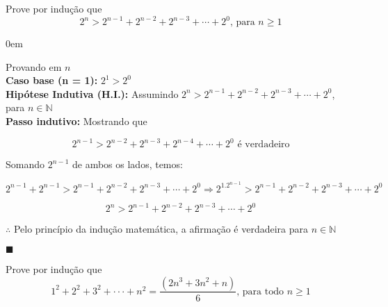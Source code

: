 \documentclass[12pt]{article}
\newcommand{\N}{\mathbb{N}}
\renewcommand{\qed}{\hfill$\blacksquare$}
\renewenvironment{proof}{\begin{addmargin}[1em]{0em}\begin{newproof}}{\end{newproof}\end{addmargin}\qed}
\newenvironment{problem}[2][Problema]{\begin{trivlist}
\item[\hskip \labelsep {\bfseries #1}\hskip \labelsep {\bfseries #2.}]}{\end{trivlist}}
\begin{document}
 

 
 
\begin{problem}{1}
Prove por indução que $$2^n > 2^{n-1} + 2^{n-2} + 2^{n-3} + \cdots + 2^0 \text{, para } n \ge 1$$
\end{problem}

\begin{proof}
    Provando em $n$ \\
    \textbf{Caso base (n = 1):  } $2^1 > 2^0$ \\
    \textbf{Hipótese Indutiva (H.I.): } Assumindo $2^n > 2^{n-1} + 2^{n-2} + 2^{n-3} + \cdots + 2^0$, para $n\in\N$ \\
    \textbf{Passo indutivo: } Mostrando que
    
    $$2^{n-1} > 2^{n-2} + 2^{n-3} + 2^{n-4} + \cdots + 2^0 \text{ é verdadeiro}$$

    Somando $2^{n-1}$ de ambos os lados, temos:

    $$2^{n-1} + 2^{n-1} > 2^{n-1} + 2^{n-2} + 2^{n-3} + \cdots + 2^0 \Longrightarrow 2^1.2^{n-1} > 2^{n-1} + 2^{n-2} + 2^{n-3} + \cdots + 2^0$$

    \begin{equation*}
        \boxed{2^{n} > 2^{n-1} + 2^{n-2} + 2^{n-3} + \cdots + 2^0}
    \end{equation*}

    $\therefore$ Pelo princípio da indução matemática, a afirmação é verdadeira para $n\in\N$
\end{proof}

\begin{problem}{2}
    Prove por indução que $$1^2 + 2^2 + 3^2 + ··· + n^2 = \frac{(2n^3 + 3n^2 + n)}{6} \text{, para todo } n \ge 1$$
\end{problem}
\end{document}
